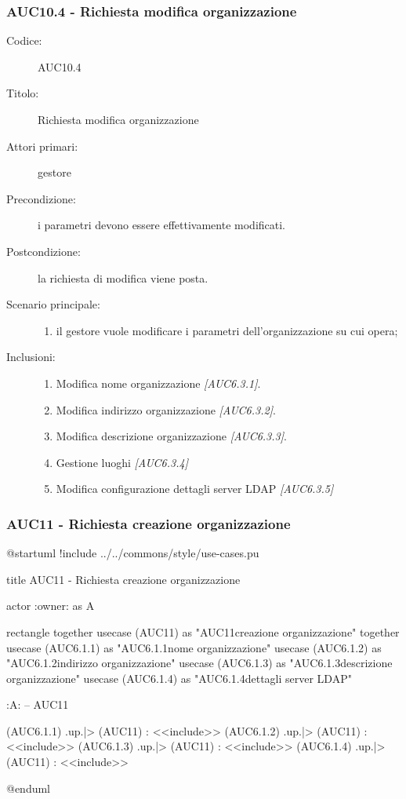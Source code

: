 \documentclass[casi-duso]{subfiles}
\begin{document}
\subsubsection{AUC10.4 - Richiesta modifica organizzazione}%
\label{subsub:AUC10.4}
\begin{description}
  \item[Codice:] AUC10.4
  \item[Titolo:] Richiesta modifica organizzazione
  \item[Attori primari:] gestore
  \item[Precondizione:] i parametri devono essere effettivamente modificati.
  \item[Postcondizione:] la richiesta di modifica viene posta.
  \item[Scenario principale:]
  \begin{enumerate}
    \item il gestore vuole modificare i parametri dell'organizzazione su cui opera;
  \end{enumerate}
  \item[Inclusioni:]
  \begin{enumerate}
    \item Modifica nome organizzazione \emph{[AUC6.3.1]}.
    \item Modifica indirizzo organizzazione \emph{[AUC6.3.2]}.
    \item Modifica descrizione organizzazione \emph{[AUC6.3.3]}.
    \item Gestione luoghi \emph{[AUC6.3.4]} 
    \item Modifica configurazione dettagli server LDAP \emph{[AUC6.3.5]} 
  \end{enumerate}
\end{description}

\subsubsection{AUC11 - Richiesta creazione organizzazione}%
\label{subsub:AUC11}

\begin{plantuml}
@startuml
!include ../../commons/style/use-cases.pu

title AUC11 - Richiesta creazione organizzazione

actor :owner: as A

rectangle {
  together {
    usecase (AUC11) as "AUC11\nRichiesta creazione organizzazione"
  }
  together {
    usecase (AUC6.1.1) as "AUC6.1.1\nInserisci nome organizzazione"
    usecase (AUC6.1.2) as "AUC6.1.2\nInserisci indirizzo organizzazione"
    usecase (AUC6.1.3) as "AUC6.1.3\nInserisci descrizione organizzazione"
    usecase (AUC6.1.4) as "AUC6.1.4\nConfigurazione dettagli server LDAP"
  }
}

:A: -- AUC11

(AUC6.1.1) .up.|> (AUC11) : <<include>>
(AUC6.1.2) .up.|> (AUC11) : <<include>>
(AUC6.1.3) .up.|> (AUC11) : <<include>>
(AUC6.1.4) .up.|> (AUC11) : <<include>>

@enduml
\end{plantuml}
\end{document}
